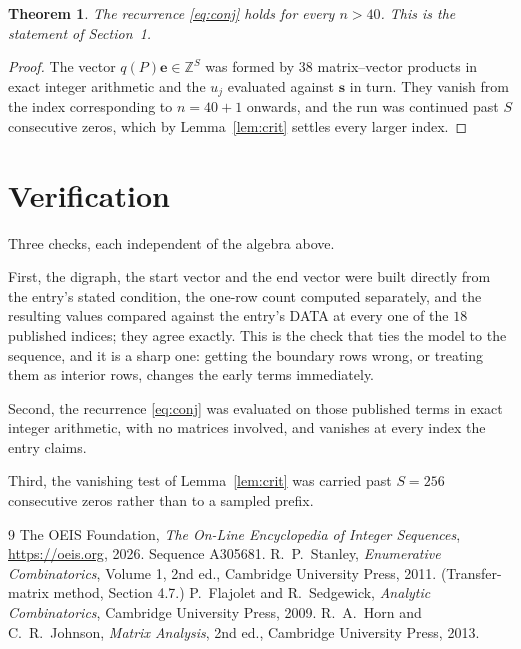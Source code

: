 \documentclass[11pt,a4paper]{article}
\theoremstyle{plain}
\newtheorem{theorem}{Theorem}
\theoremstyle{definition}
\begin{document}
\begin{theorem}
The recurrence \eqref{eq:conj} holds for every $n>40$. This is the statement of
Section~1.
\end{theorem}

\begin{proof}
The vector $q(P)\mathbf{e}\in\mathbb{Z}^{S}$ was formed by $38$ matrix--vector
products in exact integer arithmetic and the $u_j$ evaluated against $\mathbf{s}$ in turn.
They vanish from the index corresponding to $n=40+1$ onwards, and the run was continued
past $S$ consecutive zeros, which by Lemma~\ref{lem:crit} settles every larger index.
\end{proof}

\section{Verification}

Three checks, each independent of the algebra above.

First, the digraph, the start vector and the end vector were built directly from the
entry's stated condition, the one-row count computed separately, and the resulting values
compared against the entry's DATA at every one of the $18$ published indices; they
agree exactly. This is the check that ties the model to the sequence, and it is a sharp one:
getting the boundary rows wrong, or treating them as interior rows, changes the early terms
immediately.

Second, the recurrence \eqref{eq:conj} was evaluated on those published terms in exact
integer arithmetic, with no matrices involved, and vanishes at every index the entry claims.

Third, the vanishing test of Lemma~\ref{lem:crit} was carried past $S=256$ consecutive
zeros rather than to a sampled prefix.

\begin{thebibliography}{9}
 The OEIS Foundation, \emph{The On-Line Encyclopedia of Integer
Sequences}, \url{https://oeis.org}, 2026. Sequence A305681.
 R.~P.~Stanley, \emph{Enumerative Combinatorics}, Volume 1, 2nd ed.,
Cambridge University Press, 2011. (Transfer-matrix method, Section 4.7.)
 P.~Flajolet and R.~Sedgewick, \emph{Analytic Combinatorics}, Cambridge
University Press, 2009.
 R.~A.~Horn and C.~R.~Johnson, \emph{Matrix Analysis}, 2nd ed., Cambridge
University Press, 2013.
\end{thebibliography}
\end{document}
